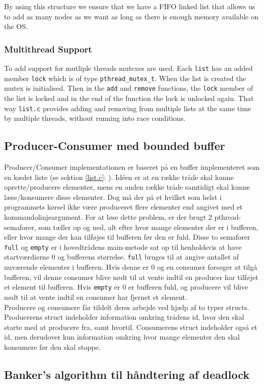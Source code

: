 By using this structure we ensure that we have a FIFO linked list that allows us to add as many nodes as we want as long as there is enough memory available on the OS.

\subsubsection{Multithread Support}
To add support for mutliple threads mutexes are used. Each \texttt{list} has an added member \texttt{lock} which is of type \texttt{pthread\_mutex\_t}. When the list is created the mutex is initialised. Then in the \texttt{add} and \texttt{remove} functions, the \texttt{lock} member of the list is locked and in the end of the function the lock is unlocked again. That way \texttt{list.c} provides adding and removing from multiple lists at the same time by multiple threads, without running into race conditions.

\subsection{Producer-Consumer med bounded buffer}
Producer/Consumer implementationen er baseret på en buffer implementeret som en kædet liste (se sektion \ref{list.c}: ). Idéen er at en række tråde skal kunne oprette/producere elementer, mens en anden række tråde samtidigt skal kunne læse/konsumere disse elementer. Dog må der på et hvilket som helst i programmets kørsel ikke være produceret flere elementer end angivet med et kommandolinjeargument. For at løse dette problem, er der brugt 2 pthread-semaforer, som tæller op og ned, alt efter hvor mange elementer der er i bufferen, eller hvor mange der kan tilføjes til bufferen før den er fuld. Disse to semaforer \texttt{full} og \texttt{empty} er i hovedtrådens main-metode sat op til henholdsvis at have startværdierne 0 og bufferens størrelse. \texttt{full} bruges til at angive antallet af nuværende elementer i bufferen. Hvis denne er 0 og en consumer forsøger at tilgå bufferen, vil denne consumer blive nødt til at vente indtil en producer har tilføjet et element til bufferen. Hvis \texttt{empty} er 0 er bufferen fuld, og producere vil blive nødt til at vente indtil en consumer har fjernet et element.\\

Producere og consumere får tildelt deres arbejde ved hjælp af to typer structs. Producerens struct indeholder information omkring trådens id, hvor den skal starte med at producere fra, samt hvortil. Consumerens struct indeholder også et id, men derudover kun information omkring hvor mange elementer den skal konsumere før den skal stoppe.

\subsection{Banker's algorithm til håndtering af deadlock}


